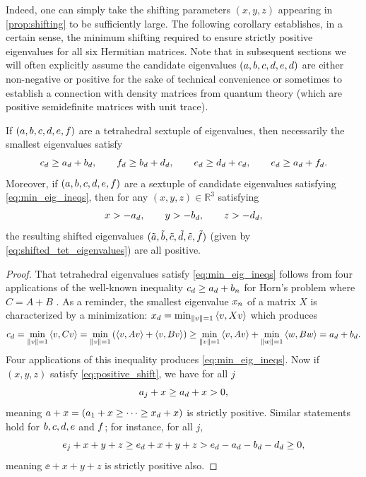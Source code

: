 \documentclass[notitlepage, 10pt]{article}
\begin{document}
Indeed, one can simply take the shifting parameters $(x,y,z)$ appearing in \cref{prop:shifting} to be sufficiently large.
The following corollary establishes, in a certain sense, the minimum shifting required to ensure strictly positive eigenvalues for all six Hermitian matrices.
Note that in subsequent sections we will often explicitly assume the candidate eigenvalues $(a,b,c,d,e,d)$ are either non-negative or positive for the sake of technical convenience or sometimes to establish a connection with density matrices from quantum theory (which are positive semidefinite matrices with unit trace).
\begin{cor}
    \label{cor:psd}
    If $(a, b, c, d, e, f)$ are a tetrahedral sextuple of eigenvalues, then necessarily the smallest eigenvalues satisfy
    \begin{equation}
        \label{eq:min_eig_ineqs}
        c_d \geq a_d + b_d, \qquad f_d \geq b_d + d_d, \qquad e_d \geq d_d + c_d, \qquad e_d \geq a_d + f_d.
    \end{equation}
    Moreover, if $(a, b, c, d, e, f)$ are a sextuple of candidate eigenvalues satisfying \cref{eq:min_eig_ineqs}, then for any $(x,y,z) \in \mathbb R^{3}$ satisfying
    \begin{equation}
        \label{eq:positive_shift}
        x > -a_d, \qquad
        y > -b_d, \qquad
        z > -d_d,
    \end{equation}
    the resulting shifted eigenvalues $(\tilde {a}, \tilde {b}, \tilde {c}, \tilde {d}, \tilde {e}, \tilde {f})$ (given by \cref{eq:shifted_tet_eigenvalues}) are all positive.
\end{cor}
\begin{proof}
    That tetrahedral eigenvalues satisfy \cref{eq:min_eig_ineqs} follows from four applications of the well-known inequality $c_d \geq a_d + b_n$ for Horn's problem where $C=A+B$ \cite{bhatia2001linear}.
    As a reminder, the smallest eigenvalue $x_n$ of a matrix $X$ is characterized by a minimization: $x_d = \min_{\left\lVert v\right\rVert = 1} \braket{v, Xv}$ which produces
    \begin{equation}
        c_d = \min_{\left\lVert v\right\rVert = 1} \braket{v, C v} = \min_{\left\lVert v\right\rVert = 1} \left(\braket{v, A v} + \braket{v, B v}\right) \geq \min_{\left\lVert v\right\rVert = 1} \braket{v, A v} + \min_{\left\lVert w\right\rVert = 1}\braket{w, B w} = a_d + b_d.
    \end{equation}
    Four applications of this inequality produces \cref{eq:min_eig_ineqs}.
    Now if $(x,y,z)$ satisfy \cref{eq:positive_shift}, we have for all $j$
    \begin{equation}
        a_j + x \geq a_d + x > 0,
    \end{equation}
    meaning $a+x = (a_1 + x \geq \cdots \geq x_d + x)$ is strictly positive.
    Similar statements hold for $b,c,d, e$ and $f$; for instance, for all $j$,
    \begin{equation}
        e_j + x + y + z \geq e_d + x + y + z > e_d - a_d - b_d - d_d \geq 0,
    \end{equation}
    meaning $\ee+x+y+z$ is strictly positive also.
\end{proof}
\end{document}
